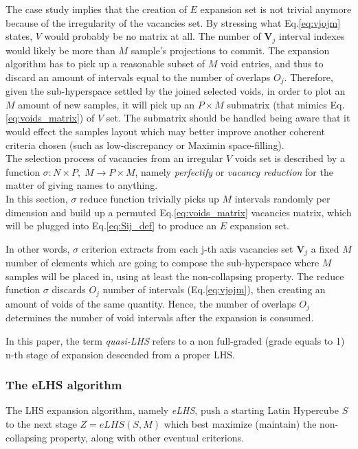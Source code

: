 \documentclass[12pt]{article}
\newcommand{\meqref}[1]{Eq.\ref{#1}}
\begin{document}
The case study implies that the creation of $E$ expansion set is not trivial anymore because of the irregularity of the vacancies set. By stressing what \meqref{eq:vjojm} states, $V$ would probably be no matrix at all. 
The number of $\textbf{V}_j$ interval indexes would likely be more than $M$ sample's projections to commit. The expansion algorithm has to pick up a reasonable subset of $M$ void entries, and thus to discard an amount of intervals equal to the number of overlaps $O_j$. Therefore, given the sub-hyperspace settled by the joined selected voids, in order to plot an $M$ amount of new samples, it will pick up an $P \times M$ submatrix (that mimics \meqref{eq:voids_matrix}) of $V$ set. The submatrix should be handled being aware that it would effect the samples layout which may better improve another coherent criteria chosen (such as low-discrepancy or Maximin space-filling).\\
The selection process of vacancies from an irregular $V$ voids set is described by a function $\sigma: N \times P, \; M \rightarrow P \times M$, namely \textit{perfectify} or \textit{vacancy reduction} for the matter of giving names to anything. \\ 
In this section, $\sigma$ reduce function trivially picks up $M$ intervals randomly per dimension and build up a permuted \meqref{eq:voids_matrix} vacancies matrix, which will be plugged into \meqref{eq:Sij_def} to produce an $E$ expansion set. 

In other words, $\sigma$ criterion extracts from each j-th axis vacancies set $\textbf{V}_j$ a fixed $M$ number of elements which are going to compose the sub-hyperspace where $M$ samples will be placed in, using at least the non-collapsing property. The reduce function $\sigma$ discards $O_j$ number of intervals (\meqref{eq:vjojm}), then creating an amount of voids of the same quantity. Hence, the number of overlaps $O_j$ determines the number of void intervals after the expansion is consumed.

In this paper, the term \textit{quasi-LHS} refers to a non full-graded (grade equals to 1) n-th stage of expansion descended from a proper LHS.

\subsubsection{The eLHS algorithm}
\label{subsubsec:algorithm}
The LHS expansion algorithm, namely \textit{eLHS}, push a starting Latin Hypercube $S$ to the next stage $Z = eLHS(S, M)$ which best maximize (maintain) the non-collapsing property, along with other eventual criterions.
\end{document}
